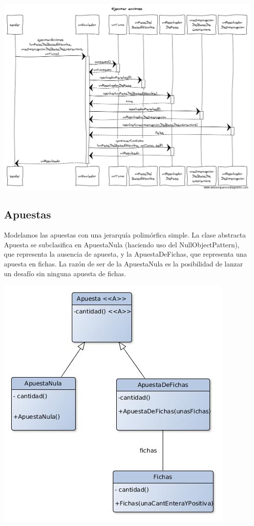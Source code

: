 \begin{center}
\includegraphics[scale=0.4, angle=90]{diseno/Ejecutar_acciones.png}
\end{center}


\subsection{Apuestas}

Modelamos las apuestas con una jerarquía polimórfica simple. La clase abstracta Apuesta se subclasifica en ApuestaNula (haciendo uso del NullObjectPattern), que representa la ausencia de apuesta, y la ApuestaDeFichas, que representa una apuesta en fichas. La razón de ser de la ApuestaNula es la posibilidad de lanzar un desafío sin ninguna apuesta de fichas.\\
\begin{center}
\includegraphics[scale=0.4]{diseno/apuestas.jpg}
\end{center}

